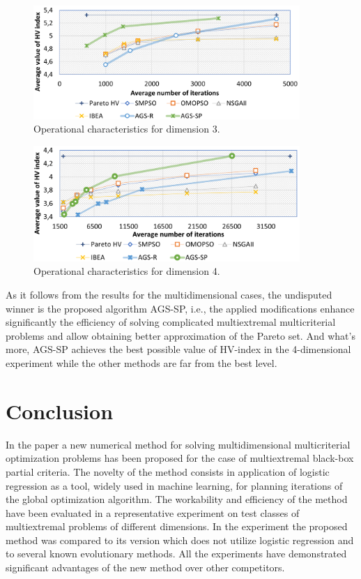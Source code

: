 \documentclass[runningheads]{llncs}
\begin{document}
\begin{figure}
\centering
\includegraphics[width=0.9\textwidth]{fig4}
\caption{Operational characteristics for dimension 3.} \label{fig:4}
\end{figure}

\begin{figure}
\centering
\includegraphics[width=0.9\textwidth]{fig5}
\caption{Operational characteristics for dimension 4.} \label{fig:5}
\end{figure}

As it follows from the results for the multidimensional cases, the undisputed winner is the proposed algorithm AGS-SP, i.e., the applied modifications enhance significantly the efficiency of solving complicated multiextremal multicriterial problems and allow obtaining better approximation of the Pareto set. And what's more, AGS-SP achieves the best possible value of HV-index in the 4-dimensional experiment while the other methods are far from the best level.


\section{Conclusion}\label{sec:5}

In the paper a new numerical method for solving multidimensional multicriterial  optimization problems has been proposed for the case of multiextremal black-box partial criteria. The novelty of the method consists in application of logistic regression as a tool, widely used in machine learning, for planning iterations of the global optimization algorithm. The workability and efficiency of the method have been evaluated in a representative experiment on test classes of multiextremal problems of different dimensions. In the experiment the proposed method was compared to its version which does not utilize logistic regression and to several known evolutionary methods. All the experiments have demonstrated significant advantages of the new method over other competitors.
\end{document}
